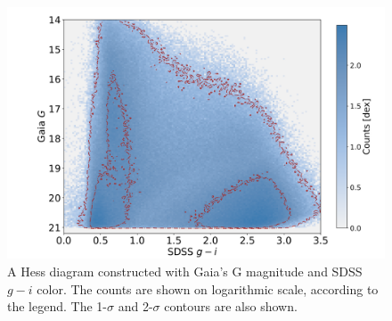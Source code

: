 \documentclass[fleqn,usenatbib]{mnras}
\begin{document}
\begin{figure}
    \centering\includegraphics[width=0.99\columnwidth]{figures/G-gi-Hess.png} 
\caption{A Hess diagram constructed with Gaia's G magnitude and SDSS $g-i$ color.
The counts are shown on logarithmic scale, according to the legend. The 1-$\sigma$
and 2-$\sigma$ contours are also shown.}
\label{fig:Ggi}
\end{figure}
\end{document}

